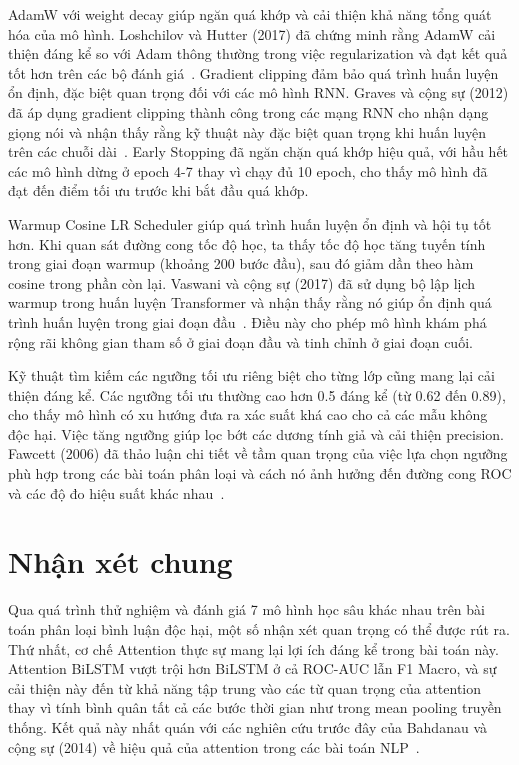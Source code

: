 \documentclass[../BTL.tex]{subfiles}
\begin{document}
AdamW với weight decay giúp ngăn quá khớp và cải thiện khả năng tổng quát hóa của mô hình. Loshchilov và Hutter (2017) đã chứng minh rằng AdamW cải thiện đáng kể so với Adam thông thường trong việc regularization và đạt kết quả tốt hơn trên các bộ đánh giá~\cite{loshchilov2017adamw}. Gradient clipping đảm bảo quá trình huấn luyện ổn định, đặc biệt quan trọng đối với các mô hình RNN. Graves và cộng sự (2012) đã áp dụng gradient clipping thành công trong các mạng RNN cho nhận dạng giọng nói và nhận thấy rằng kỹ thuật này đặc biệt quan trọng khi huấn luyện trên các chuỗi dài~\cite{graves2012supervised}. Early Stopping đã ngăn chặn quá khớp hiệu quả, với hầu hết các mô hình dừng ở epoch 4-7 thay vì chạy đủ 10 epoch, cho thấy mô hình đã đạt đến điểm tối ưu trước khi bắt đầu quá khớp.

Warmup Cosine LR Scheduler giúp quá trình huấn luyện ổn định và hội tụ tốt hơn. Khi quan sát đường cong tốc độ học, ta thấy tốc độ học tăng tuyến tính trong giai đoạn warmup (khoảng 200 bước đầu), sau đó giảm dần theo hàm cosine trong phần còn lại. Vaswani và cộng sự (2017) đã sử dụng bộ lập lịch warmup trong huấn luyện Transformer và nhận thấy rằng nó giúp ổn định quá trình huấn luyện trong giai đoạn đầu~\cite{vaswani2017transformer}. Điều này cho phép mô hình khám phá rộng rãi không gian tham số ở giai đoạn đầu và tinh chỉnh ở giai đoạn cuối.

Kỹ thuật tìm kiếm các ngưỡng tối ưu riêng biệt cho từng lớp cũng mang lại cải thiện đáng kể. Các ngưỡng tối ưu thường cao hơn 0.5 đáng kể (từ 0.62 đến 0.89), cho thấy mô hình có xu hướng đưa ra xác suất khá cao cho cả các mẫu không độc hại. Việc tăng ngưỡng giúp lọc bớt các dương tính giả và cải thiện precision. Fawcett (2006) đã thảo luận chi tiết về tầm quan trọng của việc lựa chọn ngưỡng phù hợp trong các bài toán phân loại và cách nó ảnh hưởng đến đường cong ROC và các độ đo hiệu suất khác nhau~\cite{fawcett2006introduction}.

\section{Nhận xét chung}
Qua quá trình thử nghiệm và đánh giá 7 mô hình học sâu khác nhau trên bài toán phân loại bình luận độc hại, một số nhận xét quan trọng có thể được rút ra. Thứ nhất, cơ chế Attention thực sự mang lại lợi ích đáng kể trong bài toán này. Attention BiLSTM vượt trội hơn BiLSTM ở cả ROC-AUC lẫn F1 Macro, và sự cải thiện này đến từ khả năng tập trung vào các từ quan trọng của attention thay vì tính bình quân tất cả các bước thời gian như trong mean pooling truyền thống. Kết quả này nhất quán với các nghiên cứu trước đây của Bahdanau và cộng sự (2014) về hiệu quả của attention trong các bài toán NLP~\cite{bahdanau2014attention}.
\end{document}
